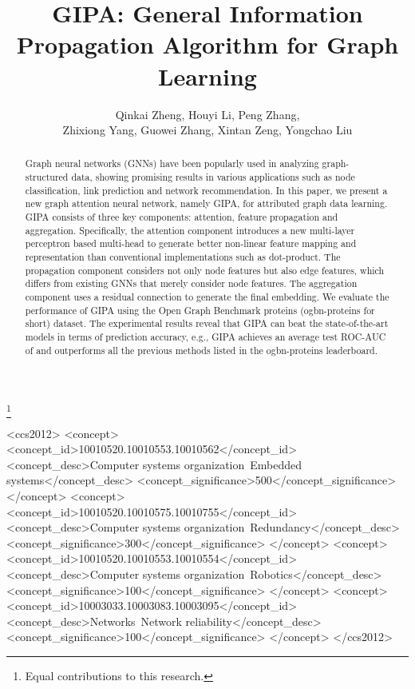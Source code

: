 \documentclass[sigconf]{acmart}
\newcommand{\model}{GIPA\xspace}
\begin{document}
\title{GIPA: General Information Propagation Algorithm for Graph Learning}



\author{Qinkai Zheng, Houyi Li, Peng Zhang,\\Zhixiong Yang, Guowei Zhang, Xintan Zeng, Yongchao Liu}
\thanks{Equal contributions to this research.}
















\renewcommand{\shortauthors}{Zheng and Li, et al.}


\begin{abstract}
Graph neural networks (GNNs) have been popularly used in analyzing graph-structured data,  showing promising results in various applications such as node classification, link prediction and network recommendation. 
In this paper, we present a new graph attention neural network, namely \model, for attributed graph data learning.
\model consists of three key components: attention, feature propagation and aggregation.
Specifically, the attention component introduces a new  multi-layer perceptron based multi-head to generate better  non-linear feature mapping and representation than conventional implementations such as dot-product. 
The propagation component considers not only node features but also edge features, which differs from existing GNNs that merely consider node features.
The aggregation component uses a residual connection to generate the final embedding.
We evaluate the performance of \model using the Open Graph Benchmark proteins (ogbn-proteins for short) dataset.
The experimental results reveal that \model can beat the  state-of-the-art models in terms of prediction accuracy, e.g., \model achieves an average test ROC-AUC of  and outperforms all the previous methods listed in the ogbn-proteins leaderboard.
\end{abstract}

\begin{CCSXML}
<ccs2012>
 <concept>
  <concept_id>10010520.10010553.10010562</concept_id>
  <concept_desc>Computer systems organization~Embedded systems</concept_desc>
  <concept_significance>500</concept_significance>
 </concept>
 <concept>
  <concept_id>10010520.10010575.10010755</concept_id>
  <concept_desc>Computer systems organization~Redundancy</concept_desc>
  <concept_significance>300</concept_significance>
 </concept>
 <concept>
  <concept_id>10010520.10010553.10010554</concept_id>
  <concept_desc>Computer systems organization~Robotics</concept_desc>
  <concept_significance>100</concept_significance>
 </concept>
 <concept>
  <concept_id>10003033.10003083.10003095</concept_id>
  <concept_desc>Networks~Network reliability</concept_desc>
  <concept_significance>100</concept_significance>
 </concept>
</ccs2012>
\end{CCSXML}
\end{document}
